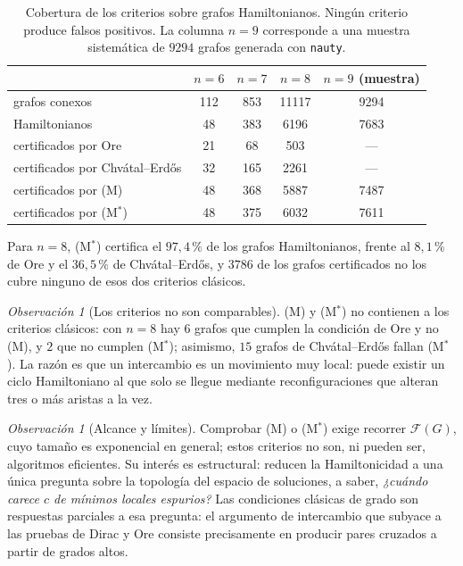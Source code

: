 \documentclass[11pt,a4paper]{article}
\theoremstyle{definition}
\theoremstyle{remark}
\newtheorem{observacion}[teorema]{Observación}
\begin{document}
\begin{table}[h]
\centering
\begin{tabular}{lcccc}
\toprule
& $n=6$ & $n=7$ & $n=8$ & $n=9$ (muestra)\\
\midrule
grafos conexos & 112 & 853 & 11117 & 9294\\
Hamiltonianos & 48 & 383 & 6196 & 7683\\
\midrule
certificados por Ore & 21 & 68 & 503 & ---\\
certificados por Chvátal--Erdős & 32 & 165 & 2261 & ---\\
certificados por (M) & 48 & 368 & 5887 & 7487\\
certificados por (M$^*$) & 48 & 375 & 6032 & 7611\\
\bottomrule
\end{tabular}
\caption{Cobertura de los criterios sobre grafos Hamiltonianos. Ningún criterio produce falsos positivos. La columna $n=9$ corresponde a una muestra sistemática de $9294$ grafos generada con \texttt{nauty}.}\label{tab:fusion}
\end{table}

Para $n=8$, (M$^*$) certifica el $97{,}4\,\%$ de los grafos Hamiltonianos, frente al $8{,}1\,\%$ de Ore y el $36{,}5\,\%$ de Chvátal--Erdős, y $3786$ de los grafos certificados no los cubre ninguno de esos dos criterios clásicos.

\begin{observacion}[Los criterios no son comparables]\label{obs:incomp}
(M) y (M$^*$) no contienen a los criterios clásicos: con $n=8$ hay $6$ grafos que cumplen la condición de Ore y no (M), y $2$ que no cumplen (M$^*$); asimismo, $15$ grafos de Chvátal--Erdős fallan (M$^*$). La razón es que un intercambio es un movimiento muy local: puede existir un ciclo Hamiltoniano al que solo se llegue mediante reconfiguraciones que alteran tres o más aristas a la vez.
\end{observacion}

\begin{observacion}[Alcance y límites]
Comprobar (M) o (M$^*$) exige recorrer $\mathcal{F}(G)$, cuyo tamaño es exponencial en general; estos criterios no son, ni pueden ser, algoritmos eficientes. Su interés es estructural: reducen la Hamiltonicidad a una única pregunta sobre la topología del espacio de soluciones, a saber, \emph{¿cuándo carece $c$ de mínimos locales espurios?} Las condiciones clásicas de grado son respuestas parciales a esa pregunta: el argumento de intercambio que subyace a las pruebas de Dirac y Ore consiste precisamente en producir pares cruzados a partir de grados altos.
\end{observacion}
\end{document}
